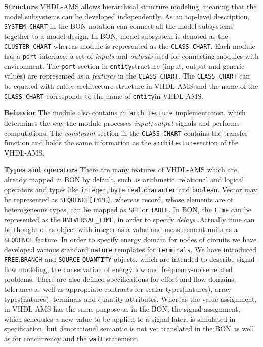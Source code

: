 \documentclass{article}
\def\lstinlinen{\lstinline[language=Bon,basicstyle=\normalsize\upshape]}
\newcommand{\ent}{entity\xspace}
\newcommand{\arch}{architecture\xspace}
\begin{document}
\textbf{Structure} \xspace \xspace VHDL-AMS allows hierarchical
structure modeling, meaning that the model subsystems can be developed
independently.  As an top-level description, \lstinlinen|SYSTEM_CHART|
in the BON notation can connect all the model subsystems together to a
model design.  In BON, model subsystem is denoted as the
\lstinlinen|CLUSTER_CHART| whereas module is represented as the
\lstinlinen|CLASS_CHART|.  Each module has a \texttt{port} interface:
a set of \emph{inputs} and \emph{outputs} used for connecting modules
with environment. The \texttt{port} section in \texttt{\ent}structure
(input, output and generic values) are represented as a
\emph{features} in the \lstinlinen|CLASS_CHART|.  The
\lstinlinen|CLASS_CHART| \xspace can be equated with \ent-\arch
structure in VHDL-AMS and the name of the
\lstinlinen|CLASS_CHART|\xspace corresponds to the name of
\texttt{\ent}in VHDL-AMS.
 
\textbf{Behavior} \xspace \xspace The module also contains an
\texttt{\arch} implementation, which determines the way the module
processes \emph{input}/\emph{output} signals and performs
computations.  The \emph{constraint} section in the
\lstinlinen|CLASS_CHART| contains the transfer function and holds the
same information as the \texttt{\arch}section of the VHDL-AMS.
 
\textbf{Types and operators} \xspace \xspace There are many features
of VHDL-AMS which are already mapped in BON by default, such as
arithmetic, relational and logical operators and types like \xspace
\texttt{integer}, \xspace
\texttt{byte},\xspace\texttt{real},\xspace\texttt{character} and
\xspace\texttt{boolean}.  Vector may be represented as
\lstinlinen|SEQUENCE[TYPE]|, whereas record, whose elements are of
heterogeneous types, can be mapped as \lstinlinen|SET| or
\lstinlinen|TABLE|.  In BON, the \texttt{time} can be represented as
the \lstinlinen|UNIVERSAL_TIME|, in order to specify
\emph{delays}. Actually time can be thought of as object with integer
as a value and measurement units as a \xspace \lstinlinen|SEQUENCE|
feature.  In order to specify energy domain for nodes of circuits we
have developed various standard \texttt{nature} templates for
\texttt{terminals}.  We have introduced
\xspace\lstinlinen|FREE|,\xspace \lstinlinen|BRANCH| and
\xspace\lstinlinen|SOURCE| \space \lstinlinen|QUANTITY| objects, which
are intended to describe signal-flow modeling, the conservation of
energy low and frequency-noise related problems.  There are also
defined specifications for effort and flow domains, tolerance as well
as appropriate contracts for scalar types(natures), array
types(natures), terminals and quantity attributes.  Whereas the value
assignment, in VHDL-AMS has the same purpose as in the BON, the signal
assignment, which schedules a new value to be applied to a signal
later, is simulated in specification, but denotational semantic is not
yet translated in the BON as well as for concurrency and the
\texttt{wait} statement.
\end{document}
